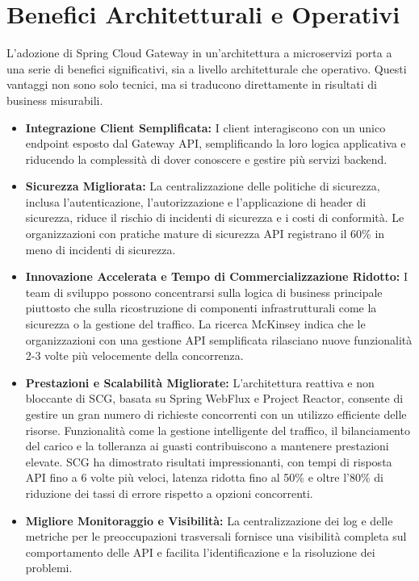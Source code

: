 \section{Benefici Architetturali e Operativi}

L'adozione di Spring Cloud Gateway in un'architettura a microservizi porta a una serie di benefici significativi, sia a livello architetturale che operativo.
 Questi vantaggi non sono solo tecnici, ma si traducono direttamente in risultati di business misurabili.

\begin{itemize}
    \item \textbf{Integrazione Client Semplificata:} I client interagiscono con un unico endpoint esposto dal Gateway API, semplificando la loro logica applicativa e riducendo la complessità di dover conoscere e gestire più servizi backend.
    \item \textbf{Sicurezza Migliorata:} La centralizzazione delle politiche di sicurezza, inclusa l'autenticazione, l'autorizzazione e l'applicazione di header di sicurezza, riduce il rischio di incidenti di sicurezza e i costi di conformità. Le organizzazioni con pratiche mature di sicurezza API registrano il 60\% in meno di incidenti di sicurezza.
    \item \textbf{Innovazione Accelerata e Tempo di Commercializzazione Ridotto:} I team di sviluppo possono concentrarsi sulla logica di business principale piuttosto che sulla ricostruzione di componenti infrastrutturali come la sicurezza o la gestione del traffico. La ricerca McKinsey indica che le organizzazioni con una gestione API semplificata rilasciano nuove funzionalità 2-3 volte più velocemente della concorrenza.
    \item \textbf{Prestazioni e Scalabilità Migliorate:} L'architettura reattiva e non bloccante di SCG, basata su Spring WebFlux e Project Reactor, consente di gestire un gran numero di richieste concorrenti con un utilizzo efficiente delle risorse. Funzionalità come la gestione intelligente del traffico, il bilanciamento del carico e la tolleranza ai guasti contribuiscono a mantenere prestazioni elevate. SCG ha dimostrato risultati impressionanti, con tempi di risposta API fino a 6 volte più veloci, latenza ridotta fino al 50\% e oltre l'80\% di riduzione dei tassi di errore rispetto a opzioni concorrenti.
    \item \textbf{Migliore Monitoraggio e Visibilità:} La centralizzazione dei log e delle metriche per le preoccupazioni trasversali fornisce una visibilità completa sul comportamento delle API e facilita l'identificazione e la risoluzione dei problemi.

\end{itemize}

